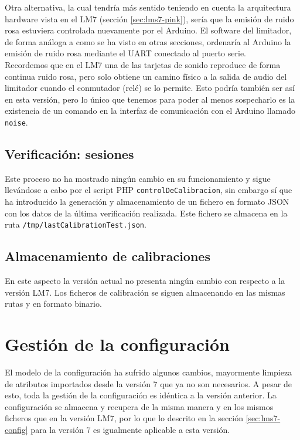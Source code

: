 Otra alternativa, la cual tendría más sentido teniendo en cuenta la arquitectura hardware vista en el LM7 (sección \ref{sec:lms7-pink}), sería que la emisión de ruido rosa estuviera controlada nuevamente por el Arduino. El software del limitador, de forma análoga a como se ha visto en otras secciones, ordenaría al Arduino la emisión de ruido rosa mediante el UART conectado al puerto serie. \\
Recordemos que en el LM7 una de las tarjetas de sonido reproduce de forma continua ruido rosa, pero solo obtiene un camino físico a la salida de audio del limitador cuando el conmutador (relé) se lo permite. Esto podría también ser así en esta versión, pero lo único que tenemos para poder al menos sospecharlo es la existencia de un comando en la interfaz de comunicación con el Arduino llamado \verb|noise|.

\subsection{Verificación: sesiones}

Este proceso no ha mostrado ningún cambio en su funcionamiento y sigue llevándose a cabo por el script PHP \verb|controlDeCalibracion|, sin embargo sí que ha introducido la generación y almacenamiento de un fichero en formato JSON con los datos de la última verificación realizada. Este fichero se almacena en la ruta \verb|/tmp/lastCalibrationTest.json|.

\subsection{Almacenamiento de calibraciones}

En este aspecto la versión actual no presenta ningún cambio con respecto a la versión LM7. Los ficheros de calibración se siguen almacenando en las mismas rutas y en formato binario.


\clearpage
\section{Gestión de la configuración}

El modelo de la configuración ha sufrido algunos cambios, mayormente limpieza de atributos importados desde la versión 7 que ya no son necesarios. A pesar de esto, toda la gestión de la configuración es idéntica a la versión anterior. La configuración se almacena y recupera de la misma manera y en los mismos ficheros que en la versión LM7, por lo que lo descrito en la sección \ref{sec:lms7-config} para la versión 7 es igualmente aplicable a esta versión.

